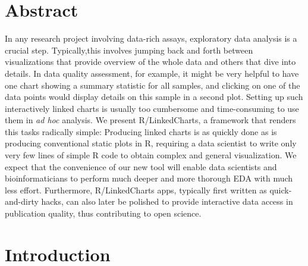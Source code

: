 \documentclass[twocolumn,10pt]{article}
\begin{document}
\setcounter{secnumdepth}{0}



\section{Abstract}
In any research project involving data-rich assays, exploratory data analysis is a crucial step. Typically,this involves jumping back and forth between visualizations that provide overview of the whole data and others that dive into details. In data quality assessment, for example, it might be very helpful to have one chart showing a summary statistic for all samples, and clicking on one of the data points would display details on this sample in a second plot. Setting up such interactively linked charts is usually too cumbersome and time-consuming to use them in \emph{ad hoc} analysis. We present R/LinkedCharts, a framework  that renders this tasks radically simple: Producing linked charts is as quickly done as is producing conventional static plots in R, requiring a data scientist to write only very few lines of simple R code to obtain complex and general visualization. We expect that the convenience of our new tool will enable data scientists and bioinformaticians to perform much deeper and more thorough EDA with much less effort. Furthermore, R/LinkedCharts apps, typically first written as quick-and-dirty hacks, can also later be polished to provide interactive data access in publication quality, thus contributing to open science.

\section{Introduction}
\end{document}
